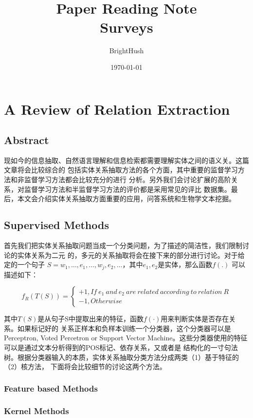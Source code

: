 \documentclass[UTF8]{ctexart}
\title{Paper Reading Note \\ Surveys}
\author{BrightHush}
\date{\today}
\begin{document}
\maketitle
\tableofcontents

\newcommand{\figref}[1]{\figurename~\ref{#1}}

\section{A Review of Relation Extraction}

\subsection{Abstract}
现如今的信息抽取、自然语言理解和信息检索都需要理解实体之间的语义关。这篇文章将会比较综合的
包括实体关系抽取方法的各个方面，其中重要的监督学习方法和非监督学习方法都会比较充分的进行
分析。另外我们会讨论扩展的高阶关系，对监督学习方法和半监督学习方法的评价都是采用常见的评比
数据集。最后，本文会介绍实体关系抽取方面重要的应用，问答系统和生物学文本挖掘。

\subsection{Supervised Methods}
首先我们把实体关系抽取问题当成一个分类问题，为了描述的简洁性，我们限制讨论的实体关系为二元
的，多元的关系抽取将会在接下来的部分进行讨论。对于给定的一个句子
$S=w_1, \dots , e_1, \dots, w_j, e_2, \dots$，其中$e_1,e_2$是实体，那么函数$f(.)$
可以描述如下：

\begin{equation}
f_R(T(S)) = 
\left\{
\begin{array}{ll}
+1, If \  e_1 \  and \  e_2 \  are \  related \  according \  to \ 
relation \ R
\\
-1, Otherwise
\end{array}
\right.
\end{equation}
\par
其中$T(S)$是从句子S中提取出来的特征，函数$f(\cdot)$用来判断实体是否存在关系。如果标记好的
关系正样本和负样本训练一个分类器，这个分类器可以是Perceptron, Voted Percetron or Support
Vector Machine。这些分类器使用的特征可以是通过文本分析得到的POS标记、依存关系，又或者是
结构化的一寸句法树。根据分类器输入的本质，实体关系抽取分类方法分成两类（1）基于特征的（2）核方法，
下面将会比较细节的讨论这两个方法。

\subsubsection{Feature based Methods}

\subsubsection{Kernel Methods}

\cite{EntityRelationExtraction}



\end{document}
